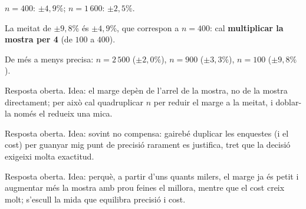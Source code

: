 \begin{solucions}
\begin{sollist}
  \item $n=400$: $\pm 4,9\%$; $n=1\,600$: $\pm 2,5\%$.
  \item La meitat de $\pm 9,8\%$ és $\pm 4,9\%$, que correspon a $n=400$: cal
        \textbf{multiplicar la mostra per 4} (de $100$ a $400$).
  \item De més a menys precisa: $n=2\,500$ ($\pm 2,0\%$), $n=900$ ($\pm 3,3\%$), $n=100$
        ($\pm 9,8\%$).
  \item Resposta oberta. Idea: el marge depèn de l'arrel de la mostra, no de la mostra
        directament; per això cal quadruplicar $n$ per reduir el marge a la meitat, i
        doblar-la només el redueix una mica.
  \item Resposta oberta. Idea: sovint no compensa: gairebé duplicar les enquestes (i el
        cost) per guanyar mig punt de precisió rarament es justifica, tret que la decisió
        exigeixi molta exactitud.
  \item Resposta oberta. Idea: perquè, a partir d'uns quants milers, el marge ja és petit i
        augmentar més la mostra amb prou feines el millora, mentre que el cost creix molt;
        s'escull la mida que equilibra precisió i cost.
\end{sollist}
\end{solucions}
